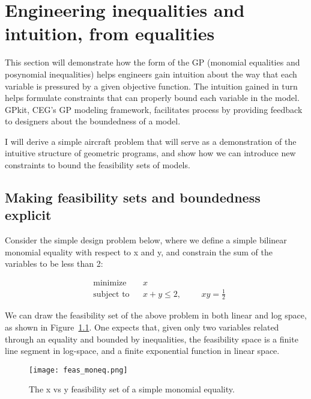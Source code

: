 \chapter{Engineering inequalities and intuition, from equalities}
\label{ch2:inequalities}

This section will demonstrate how the form of the \gls{GP} (monomial
equalities and posynomial inequalities) helps engineers gain intuition
about the way that each variable is pressured
by a given objective function. The intuition gained in turn helps formulate
constraints that can properly bound each variable in the model.
GPkit, \gls{CEG}'s \gls{GP} modeling framework,
facilitates process by providing feedback to designers about
the boundedness of a model.

I will derive a simple aircraft problem that will serve as
a demonstration of the intuitive structure of geometric programs, and show
how we can introduce new constraints to bound the feasibility sets of models.

\section{Making feasibility sets and boundedness explicit}

Consider the simple design problem below, where we define a simple bilinear
monomial equality with respect to x and y, and constrain the sum of the variables
to be less than 2:

\begin{equation*}
\begin{aligned}
& {\text{minimize}}
& & x \\
& \text{subject to}
& & x + y \leq 2,
    & & & xy = \frac{1}{2} \label{simple_moneq}
\end{aligned}
\end{equation*}

We can draw the feasibility set of the above problem in both linear and log space,
as shown in Figure~\ref{f:feas_moneq}. One expects that, given only two variables
related through an equality and bounded by inequalities, the feasibility space is
a finite line segment in log-space, and a finite exponential function in linear space.

\begin{figure}
    \centering
    \texttt{[image: feas\_moneq.png]}
    \caption{The x vs y feasibility set of a simple monomial equality.}
    \label{f:feas_moneq}
\end{figure}

